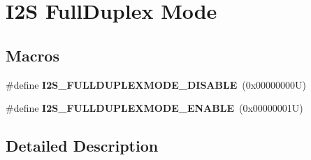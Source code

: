 \hypertarget{group___i2_s___full_duplex___mode}{}\section{I2S Full\+Duplex Mode}
\label{group___i2_s___full_duplex___mode}
\subsection*{Macros}
\begin{DoxyCompactItemize}
\item 
\mbox{\label{group___i2_s___full_duplex___mode_ga7da4a3f7309dacfd363893dced2cea9c}} 
\#define {\bfseries I2\+S\+\_\+\+F\+U\+L\+L\+D\+U\+P\+L\+E\+X\+M\+O\+D\+E\+\_\+\+D\+I\+S\+A\+B\+LE}~(0x00000000\+U)
\item 
\mbox{\label{group___i2_s___full_duplex___mode_ga48be599b5762d3c4e4c52ec3bb210938}} 
\#define {\bfseries I2\+S\+\_\+\+F\+U\+L\+L\+D\+U\+P\+L\+E\+X\+M\+O\+D\+E\+\_\+\+E\+N\+A\+B\+LE}~(0x00000001\+U)
\end{DoxyCompactItemize}


\subsection{Detailed Description}
